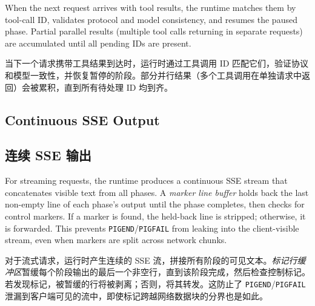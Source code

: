 When the next request arrives with tool results, the runtime matches them by tool-call ID, validates protocol and model consistency, and resumes the paused phase. Partial parallel results (multiple tool calls returning in separate requests) are accumulated until all pending IDs are present.
\begin{chinese}
当下一个请求携带工具结果到达时，运行时通过工具调用 ID 匹配它们，验证协议和模型一致性，并恢复暂停的阶段。部分并行结果（多个工具调用在单独请求中返回）会被累积，直到所有待处理 ID 均到齐。
\end{chinese}

\subsection{Continuous SSE Output}
\label{sec:sse}
\begin{chinese}
\subsection{连续 SSE 输出}
\end{chinese}

For streaming requests, the runtime produces a continuous SSE stream that concatenates visible text from all phases. A \emph{marker line buffer} holds back the last non-empty line of each phase's output until the phase completes, then checks for control markers. If a marker is found, the held-back line is stripped; otherwise, it is forwarded. This prevents \texttt{PIGEND}/\texttt{PIGFAIL} from leaking into the client-visible stream, even when markers are split across network chunks.
\begin{chinese}
对于流式请求，运行时产生连续的 SSE 流，拼接所有阶段的可见文本。\emph{标记行缓冲区}暂缓每个阶段输出的最后一个非空行，直到该阶段完成，然后检查控制标记。若发现标记，被暂缓的行将被剥离；否则，将其转发。这防止了 \texttt{PIGEND}/\texttt{PIGFAIL} 泄漏到客户端可见的流中，即使标记跨越网络数据块的分界也是如此。
\end{chinese}

